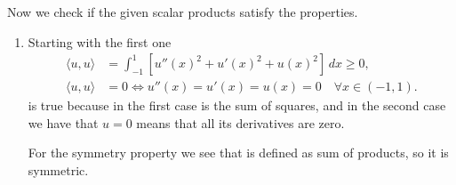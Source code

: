 Now we check if the given scalar products satisfy the properties.
\begin{enumerate}
    \item Starting with the first one
          \[
              \begin{aligned}
                  \langle u, u \rangle & = \int_{-1}^1 \left[ u''(x)^2 + u'(x)^2 + u(x)^2 \right] \, dx \geq 0, \\
                  \langle u, u \rangle & = 0 \iff u''(x) = u'(x) = u(x) = 0 \quad \forall x \in (-1, 1).
              \end{aligned}
          \]
          is true because in the first case is the sum of squares, and in the second case
          we have that \(u = 0\) means that all its derivatives are zero.

          For the symmetry property we see that is defined as sum of products, so it is
          symmetric.


\end{enumerate}
